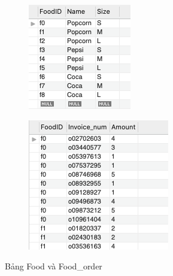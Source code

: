 \begin{figure}[H]
\begin{subfigure}{.5\textwidth}
  \centering
  \includegraphics[width=.8\linewidth]{images/FOOD.png}
\end{subfigure}%
\begin{subfigure}{.5\textwidth}
  \centering
  \includegraphics[width=.8\linewidth]{images/FOOD_ORDER.png}
\end{subfigure}
\caption{Bảng Food và Food\_order}
\end{figure}


